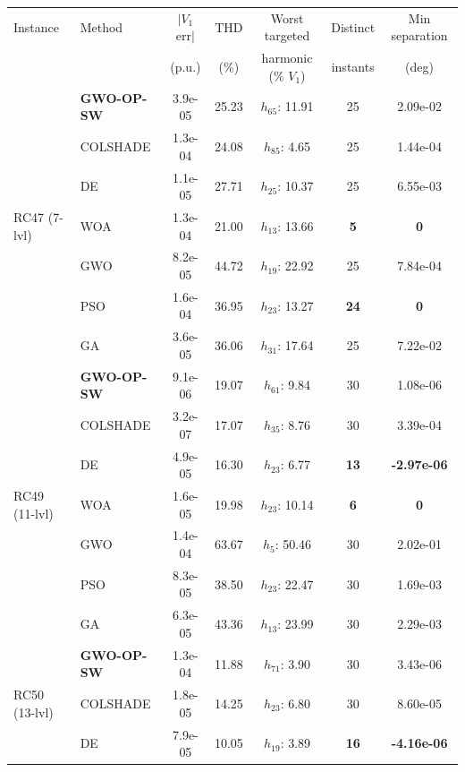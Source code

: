 \begin{tabular}{llccccc}
\hline
Instance & Method & $|V_1$ err$|$ & THD & Worst targeted & Distinct & Min separation \\
 &  & (p.u.) & (\%) & harmonic (\% $V_1$) & instants & (deg) \\
\hline
\multirow{7}{*}{RC47 (7-lvl)} & \textbf{GWO-OP-SW} & 3.9e-05 & 25.23 & $h_{65}$: 11.91 & 25 & 2.09e-02 \\
 & COLSHADE & 1.3e-04 & 24.08 & $h_{85}$: 4.65 & 25 & 1.44e-04 \\
 & DE & 1.1e-05 & 27.71 & $h_{25}$: 10.37 & 25 & 6.55e-03 \\
 & WOA & 1.3e-04 & 21.00 & $h_{13}$: 13.66 & \textbf{5} & \textbf{0} \\
 & GWO & 8.2e-05 & 44.72 & $h_{19}$: 22.92 & 25 & 7.84e-04 \\
 & PSO & 1.6e-04 & 36.95 & $h_{23}$: 13.27 & \textbf{24} & \textbf{0} \\
 & GA & 3.6e-05 & 36.06 & $h_{31}$: 17.64 & 25 & 7.22e-02 \\
\multirow{7}{*}{RC49 (11-lvl)} & \textbf{GWO-OP-SW} & 9.1e-06 & 19.07 & $h_{61}$: 9.84 & 30 & 1.08e-06 \\
 & COLSHADE & 3.2e-07 & 17.07 & $h_{35}$: 8.76 & 30 & 3.39e-04 \\
 & DE & 4.9e-05 & 16.30 & $h_{23}$: 6.77 & \textbf{13} & \textbf{-2.97e-06} \\
 & WOA & 1.6e-05 & 19.98 & $h_{23}$: 10.14 & \textbf{6} & \textbf{0} \\
 & GWO & 1.4e-04 & 63.67 & $h_{5}$: 50.46 & 30 & 2.02e-01 \\
 & PSO & 8.3e-05 & 38.50 & $h_{23}$: 22.47 & 30 & 1.69e-03 \\
 & GA & 6.3e-05 & 43.36 & $h_{13}$: 23.99 & 30 & 2.29e-03 \\
\multirow{3}{*}{RC50 (13-lvl)} & \textbf{GWO-OP-SW} & 1.3e-04 & 11.88 & $h_{71}$: 3.90 & 30 & 3.43e-06 \\
 & COLSHADE & 1.8e-05 & 14.25 & $h_{23}$: 6.80 & 30 & 8.60e-05 \\
 & DE & 7.9e-05 & 10.05 & $h_{19}$: 3.89 & \textbf{16} & \textbf{-4.16e-06} \\
\hline
\end{tabular}

